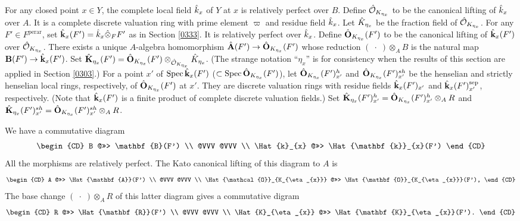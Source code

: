 \documentclass{amsart}
\theoremstyle{remark}
\numberwithin{equation}{subsection}
\newcommand{\Order}{\mathcal{O}}
\newcommand{\tensor}{\mathbin{\otimes}}
\newcommand{\sep}{\mathrm{sep}}
\newcommand{\perar}{\mathrm{perar}}
\newcommand{\alg}[1]{\mathbf{#1}}
\newcommand{\var}{\;\cdot\;}
\DeclareMathOperator{\Spec}{Spec}
\begin{document}
For any closed point $x \in Y$,
the complete local field $\Hat{k}_{x}$ of $Y$ at $x$ is relatively perfect over $B$.
Define $\Hat{\Order}_{K_{\eta_{x}}}$ to be the canonical lifting of $\Hat{k}_{x}$ over $A$.
It is a complete discrete valuation ring with prime element $\varpi$ and residue field $\Hat{k}_{x}$.
Let $\Hat{K}_{\eta_{x}}$ be the fraction field of $\Hat{\Order}_{K_{\eta_{x}}}$.
For any $F' \in F^{\perar}$,
set $\Hat{\alg{k}}_{x}(F') = \Hat{k}_{x} \Hat{\tensor}_{F} F'$ as in
Section \ref{0333}.
It is relatively perfect over $\Hat{k}_{x}$.
Define $\Hat{\alg{O}}_{K_{\eta_{x}}}(F')$ to be the canonical lifting of
$\Hat{\alg{k}}_{x}(F')$ over $\Hat{\Order}_{K_{\eta_{x}}}$.
There exists a unique $A$-algebra homomorphism $\Hat{\alg{A}}(F') \to \Hat{\alg{O}}_{K_{\eta_{x}}}(F')$
whose reduction $(\var) \tensor_{A} B$ is the natural map $\alg{B}(F') \to \Hat{\alg{k}}_{x}(F')$.
Set $\Hat{\alg{K}}_{\eta_{x}}(F') = \Hat{\alg{O}}_{K_{\eta_{x}}}(F') \tensor_{\Hat{\Order}_{K_{\eta_{x}}}} \Hat{K}_{\eta_{x}}$.
(The strange notation ``$\eta_{x}$'' is for consistency
when the results of this section are applied in Section \ref{0303}.)
For a point $x'$ of $\Spec \Hat{\alg{k}}_{x}(F')$ ($\subset \Spec \Hat{\alg{O}}_{K_{\eta_{x}}}(F')$),
let $\Hat{\alg{O}}_{K_{\eta_{x}}}(F')_{x'}^{h}$ and $\Hat{\alg{O}}_{K_{\eta_{x}}}(F')_{x'}^{sh}$ be
the henselian and strictly henselian local rings, respectively, of $\Hat{\alg{O}}_{K_{\eta_{x}}}(F')$ at $x'$.
They are discrete valuation rings
with residue fields $\Hat{\alg{k}}_{x}(F')_{x'}$ and $\Hat{\alg{k}}_{x}(F')_{x'}^{\sep}$, respectively.
(Note that $\Hat{\alg{k}}_{x}(F')$ is a finite product of complete discrete valuation fields.)
Set $\Hat{\alg{K}}_{\eta_{x}}(F')_{x'}^{h} = \Hat{\alg{O}}_{K_{\eta_{x}}}(F')_{x'}^{h} \tensor_{A} R$
and $\Hat{\alg{K}}_{\eta_{x}}(F')_{x'}^{sh} = \Hat{\alg{O}}_{K_{\eta_{x}}}(F')_{x'}^{sh} \tensor_{A} R$.

We have a commutative diagram
	\[
		\begin{CD}
				B
			@>>>
				\alg{B}(F')
			\\ @VVV @VVV \\
				\Hat{k}_{x}
			@>>>
				\Hat{\alg{k}}_{x}(F')
		\end{CD}
	\]
All the morphisms are relatively perfect.
The Kato canonical lifting of this diagram to $A$ is
	\[
		\begin{CD}
				A
			@>>>
				\Hat{\alg{A}}(F')
			\\ @VVV @VVV \\
				\Hat{\Order}_{K_{\eta_{x}}}
			@>>>
				\Hat{\alg{O}}_{K_{\eta_{x}}}(F'),
		\end{CD}
	\]
The base change $(\var) \tensor_{A} R$ of this latter diagram gives a commutative digram
	\[
		\begin{CD}
				R
			@>>>
				\Hat{\alg{R}}(F')
			\\ @VVV @VVV \\
				\Hat{K}_{\eta_{x}}
			@>>>
				\Hat{\alg{K}}_{\eta_{x}}(F').
		\end{CD}
	\]
\end{document}
